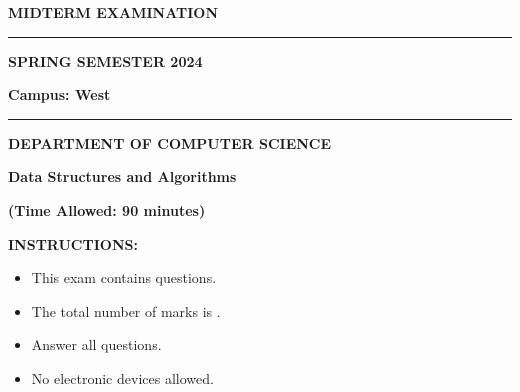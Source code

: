 \documentclass[addpoints,12pt]{exam}
\begin{document}
\begin{center}
  \vspace*{1cm}
  
  \textbf{\fontsize{20}{8}\selectfont MIDTERM EXAMINATION}
  
  \vspace{0.4cm}
  
  \noindent\rule{0.6\linewidth}{0.4pt}
  
  \vspace{0.5cm}
  
  \textbf{\fontsize{12}{8}\selectfont SPRING SEMESTER 2024}
  
  \vspace{0.2cm}
  
  \textbf{\fontsize{12}{8}\selectfont Campus: West}
  
  \noindent\rule{0.6\linewidth}{0.4pt}
      
  \vspace{0.8cm}
  
  \textbf{\fontsize{12}{8}\selectfont DEPARTMENT OF COMPUTER SCIENCE}
  
  \vspace{0.8cm}
  
  \textbf{\fontsize{12}{8}\selectfont Data Structures and Algorithms}
  
  \vspace{0.8cm}
  
  \textbf{\fontsize{12}{8}\selectfont (Time Allowed: 90 minutes)}
\end{center}

\vspace{0.8cm}

\qquad
{\fontsize{12}{12}\selectfont
   \textbf{INSTRUCTIONS:}
      \begin{itemize}
      \setlength{\leftskip}{40pt}
        \item This exam contains \fbox{\numquestions} questions.
        \item The total number of marks is \fbox{\numpoints}.
        \item Answer all questions.
        \item No electronic devices allowed.
      \end{itemize}
   \setlength{\leftskip}{0pt}
}

\vfill
\begin{center}\gradetable[h][questions]\end{center}

\newpage
\end{document}
